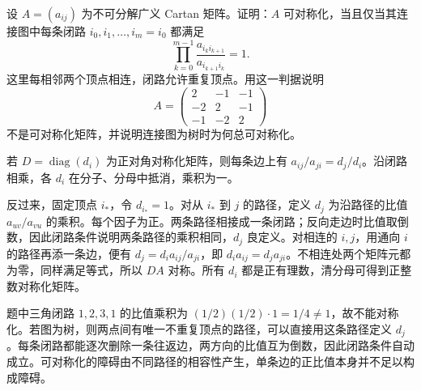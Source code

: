 \begin{exercise}\label{b5:ex:G-symmetrizing-cycle}
	设 \(A=(a_{ij})\) 为不可分解广义 Cartan 矩阵。证明：\(A\) 可对称化，当且仅当其连接图中每条闭路 \(i_0,i_1,\ldots,i_m=i_0\) 都满足
	\[
		\prod_{k=0}^{m-1}\frac{a_{i_k i_{k+1}}}{a_{i_{k+1}i_k}}=1.
	\]
	这里每相邻两个顶点相连，闭路允许重复顶点。用这一判据说明
	\[
		A=\begin{pmatrix}2&-1&-1\\-2&2&-1\\-1&-2&2\end{pmatrix}
	\]
	不是可对称化矩阵，并说明连接图为树时为何总可对称化。
\end{exercise}
\begin{solution}
	若 \(D=\operatorname{diag}(d_i)\) 为正对角对称化矩阵，则每条边上有 \(a_{ij}/a_{ji}=d_j/d_i\)。沿闭路相乘，各 \(d_i\) 在分子、分母中抵消，乘积为一。

	反过来，固定顶点 \(i_*\)，令 \(d_{i_*}=1\)。对从 \(i_*\) 到 \(j\) 的路径，定义 \(d_j\) 为沿路径的比值 \(a_{uv}/a_{vu}\) 的乘积。每个因子为正。两条路径相接成一条闭路；反向走边时比值取倒数，因此闭路条件说明两条路径的乘积相同，\(d_j\) 良定义。对相连的 \(i,j\)，用通向 \(i\) 的路径再添一条边，便有 \(d_j=d_i a_{ij}/a_{ji}\)，即 \(d_i a_{ij}=d_j a_{ji}\)。不相连处两个矩阵元都为零，同样满足等式，所以 \(DA\) 对称。所有 \(d_i\) 都是正有理数，清分母可得到正整数对称化矩阵。

	题中三角闭路 \(1,2,3,1\) 的比值乘积为 \((1/2)(1/2)\cdot1=1/4\ne1\)，故不能对称化。若图为树，则两点间有唯一不重复顶点的路径，可以直接用这条路径定义 \(d_j\)。每条闭路都能逐次删除一条往返边，两方向的比值互为倒数，因此闭路条件自动成立。可对称化的障碍由不同路径的相容性产生，单条边的正比值本身并不足以构成障碍。
\end{solution}

